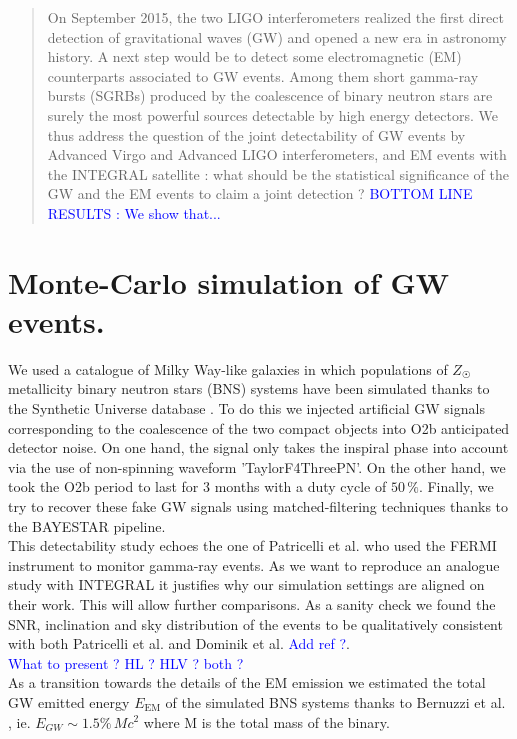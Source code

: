 \documentclass[a0,portrait]{a0poster}
\begin{document}
\begin{multicols}{2} %


 \begin{abstract}
On September 2015, the two LIGO interferometers realized the first direct detection of gravitational waves (GW) and opened a new era in astronomy history. A next step would be to detect some electromagnetic (EM) counterparts associated to GW events. Among them short gamma-ray bursts (SGRBs) produced by the coalescence of binary neutron stars are surely the most powerful sources detectable by high energy detectors. We thus address the question of the joint detectability of GW events by Advanced Virgo and Advanced LIGO interferometers, and EM events with the INTEGRAL satellite : what should be the statistical significance of the GW and the EM events to claim a joint detection ? \textcolor{blue}{BOTTOM LINE RESULTS : We show that...}
 \end{abstract}

\section*{Monte-Carlo simulation of GW events.}


\indent We used a catalogue of Milky Way-like galaxies in which populations of $Z_{\astrosun}$ metallicity binary neutron stars (BNS) systems have been simulated thanks to the Synthetic Universe database \cite{syntheticUniverse}. To do this we injected artificial GW signals corresponding to the coalescence of the two compact objects into O2b anticipated detector noise. On one hand, the signal only takes the inspiral phase into account via the use of non-spinning waveform 'TaylorF4ThreePN'. On the other hand, we took the O2b period to last for 3 months with a duty cycle of $50 \, \%$. Finally, we try to recover these fake GW signals using matched-filtering techniques thanks to the BAYESTAR pipeline. \\
\indent This detectability study echoes the one of Patricelli et al. \cite{2016arXiv160606124P} who used the \textsc{FERMI} instrument to monitor gamma-ray events. As we want to reproduce an analogue study with \textsc{INTEGRAL} it justifies why our simulation settings are aligned on their work. This will allow further comparisons. As a sanity check we found the SNR, inclination and sky distribution of the events to be qualitatively consistent with both Patricelli et al. and Dominik et al. \textcolor{blue}{Add ref ?}. \\
\textcolor{blue}{What to present ? HL ? HLV ? both ?} \\
\indent As a transition towards the details of the EM emission we estimated the total GW emitted energy $E_{\mathrm{EM}}$ of the simulated BNS systems thanks to Bernuzzi et al. \cite{2016PhRvD..94b4023B}, ie.  $E_{GW} \sim 1.5 \% \, M c^{2}$ where M is the total mass of the binary.


\end{multicols}
\end{document}

